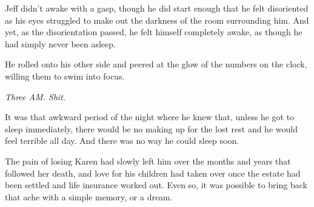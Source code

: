 Jeff didn't awake with a gasp, though he did start enough that he felt disoriented as his eyes struggled to make out the darkness of the room surrounding him.  And yet, as the disorientation passed, he felt himself completely awake, as though he had simply never been asleep.

He rolled onto his other side and peered at the glow of the numbers on the clock, willing them to swim into focus.

\textit{Three AM.  Shit.}

It was that awkward period of the night where he knew that, unless he got to sleep immediately, there would be no making up for the lost rest and he would feel terrible all day.  And there was no way he could sleep soon.

The pain of losing Karen had slowly left him over the months and years that followed her death, and love for his children had taken over once the estate had been settled and life insurance worked out.  Even so, it was possible to bring back that ache with a simple memory, or a dream.
